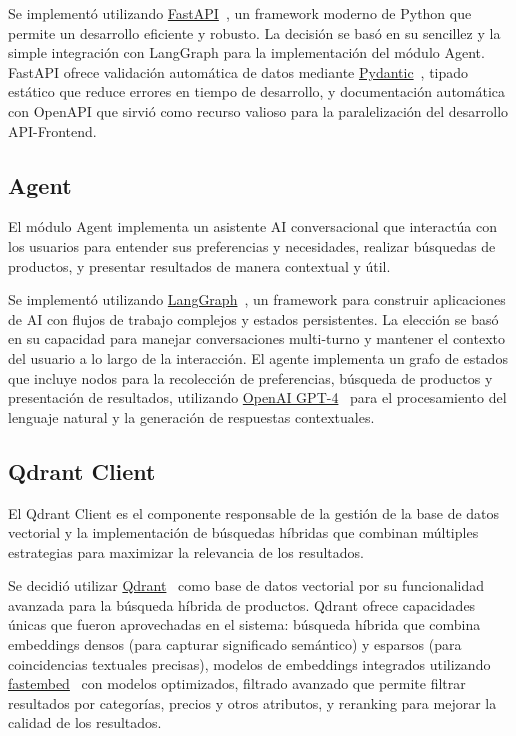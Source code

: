 Se implementó utilizando \href{https://fastapi.tiangolo.com/}{FastAPI}~\cite{FastAPI}, un framework moderno de Python que permite un desarrollo eficiente y robusto. La decisión se basó en su sencillez y la simple integración con LangGraph para la implementación del módulo Agent. FastAPI ofrece validación automática de datos mediante \href{https://docs.pydantic.dev/latest/}{Pydantic}~\cite{Pydantic}, tipado estático que reduce errores en tiempo de desarrollo, y documentación automática con OpenAPI que sirvió como recurso valioso para la paralelización del desarrollo API-Frontend.

\subsection{Agent}

El módulo Agent implementa un asistente AI conversacional que interactúa con los usuarios para entender sus preferencias y necesidades, realizar búsquedas de productos, y presentar resultados de manera contextual y útil.

Se implementó utilizando \href{https://langchain-ai.github.io/langgraph/}{LangGraph}~\cite{LangGraph}, un framework para construir aplicaciones de AI con flujos de trabajo complejos y estados persistentes. La elección se basó en su capacidad para manejar conversaciones multi-turno y mantener el contexto del usuario a lo largo de la interacción. El agente implementa un grafo de estados que incluye nodos para la recolección de preferencias, búsqueda de productos y presentación de resultados, utilizando \href{https://openai.com/}{OpenAI GPT-4}~\cite{OpenAI} para el procesamiento del lenguaje natural y la generación de respuestas contextuales.

\subsection{Qdrant Client}

El Qdrant Client es el componente responsable de la gestión de la base de datos vectorial y la implementación de búsquedas híbridas que combinan múltiples estrategias para maximizar la relevancia de los resultados.

Se decidió utilizar \href{https://qdrant.tech/}{Qdrant}~\cite{Qdrant} como base de datos vectorial por su funcionalidad avanzada para la búsqueda híbrida de productos. Qdrant ofrece capacidades únicas que fueron aprovechadas en el sistema: búsqueda híbrida que combina embeddings densos (para capturar significado semántico) y esparsos (para coincidencias textuales precisas), modelos de embeddings integrados utilizando \href{https://github.com/qdrant/fastembed}{fastembed}~\cite{FastEmbed} con modelos optimizados, filtrado avanzado que permite filtrar resultados por categorías, precios y otros atributos, y reranking para mejorar la calidad de los resultados.

